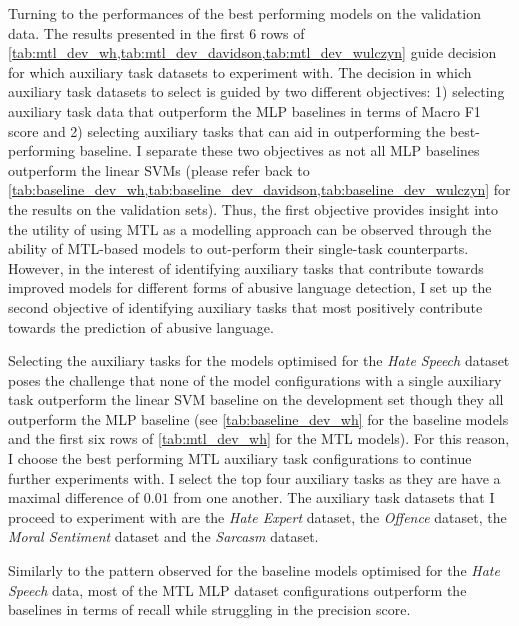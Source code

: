 Turning to the performances of the best performing models on the validation data.
The results presented in the first 6 rows of \cref{tab:mtl_dev_wh,tab:mtl_dev_davidson,tab:mtl_dev_wulczyn} guide decision for which auxiliary task datasets to experiment with.
The decision in which auxiliary task datasets to select is guided by two different objectives: 1) selecting auxiliary task data that outperform the MLP baselines in terms of Macro F1 score and 2) selecting auxiliary tasks that can aid in outperforming the best-performing baseline.
I separate these two objectives as not all MLP baselines outperform the linear SVMs (please refer back to \cref{tab:baseline_dev_wh,tab:baseline_dev_davidson,tab:baseline_dev_wulczyn} for the results on the validation sets).
Thus, the first objective provides insight into the utility of using MTL as a modelling approach can be observed through the ability of MTL-based models to out-perform their single-task counterparts.
However, in the interest of identifying auxiliary tasks that contribute towards improved models for different forms of abusive language detection, I set up the second objective of identifying auxiliary tasks that most positively contribute towards the prediction of abusive language.

Selecting the auxiliary tasks for the models optimised for the \textit{Hate Speech} dataset poses the challenge that none of the model configurations with a single auxiliary task outperform the linear SVM baseline on the development set though they all outperform the MLP baseline (see \cref{tab:baseline_dev_wh} for the baseline models and the first six rows of \cref{tab:mtl_dev_wh} for the MTL models).
For this reason, I choose the best performing MTL auxiliary task configurations to continue further experiments with.
I select the top four auxiliary tasks as they are have a maximal difference of $0.01$ from one another.
The auxiliary task datasets that I proceed to experiment with are the \textit{Hate Expert} dataset, the \textit{Offence} dataset, the \textit{Moral Sentiment} dataset and the \textit{Sarcasm} dataset.

Similarly to the pattern observed for the baseline models optimised for the \textit{Hate Speech} data, most of the MTL MLP dataset configurations outperform the baselines in terms of recall while struggling in the precision score.

